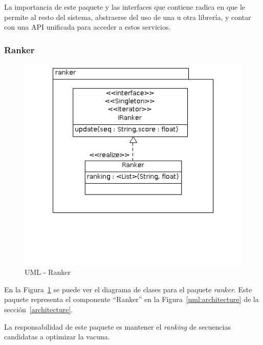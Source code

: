   La importancia de este paquete y las interfaces que contiene radica en que le
permite al resto del sistema, abstraerse del uso de una u otra librer\'ia, y
contar con una API unificada para acceder a estos servicios.    

  \subsubsection{Ranker}
  \begin{figure}
      \centering
      \includegraphics[scale=0.5]{lld-ranker.png}  
      \caption{UML - Ranker}
      \label{uml:lld-ranker}
    \end{figure}

  En la Figura~\ref{uml:lld-ranker} se puede ver el diagrama de clases
para el paquete \textit{ranker}. Este paquete representa el componente
``Ranker'' en la Figura~\ref{uml:architecture} de la
secci\'on~\ref{architecture}.

  La responsabilidad de este paquete es mantener el \textit{ranking} de
secuencias candidatas a optimizar la vacuna.

